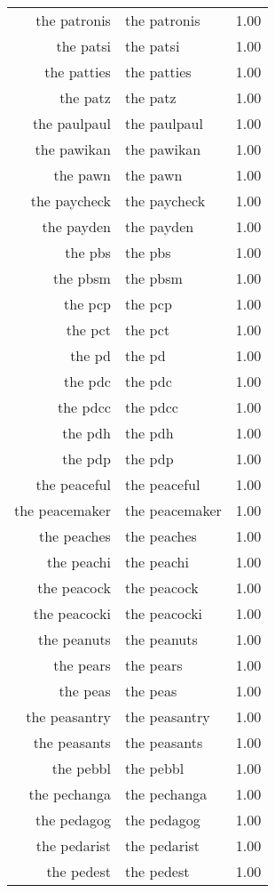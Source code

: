 \begin{table}[ht]
\begin{tabular}{rlr}
  the patronis & the patronis & 1.00 \\ 
  the patsi & the patsi & 1.00 \\ 
  the patties & the patties & 1.00 \\ 
  the patz & the patz & 1.00 \\ 
  the paulpaul & the paulpaul & 1.00 \\ 
  the pawikan & the pawikan & 1.00 \\ 
  the pawn & the pawn & 1.00 \\ 
  the paycheck & the paycheck & 1.00 \\ 
  the payden & the payden & 1.00 \\ 
  the pbs & the pbs & 1.00 \\ 
  the pbsm & the pbsm & 1.00 \\ 
  the pcp & the pcp & 1.00 \\ 
  the pct & the pct & 1.00 \\ 
  the pd & the pd & 1.00 \\ 
  the pdc & the pdc & 1.00 \\ 
  the pdcc & the pdcc & 1.00 \\ 
  the pdh & the pdh & 1.00 \\ 
  the pdp & the pdp & 1.00 \\ 
  the peaceful & the peaceful & 1.00 \\ 
  the peacemaker & the peacemaker & 1.00 \\ 
  the peaches & the peaches & 1.00 \\ 
  the peachi & the peachi & 1.00 \\ 
  the peacock & the peacock & 1.00 \\ 
  the peacocki & the peacocki & 1.00 \\ 
  the peanuts & the peanuts & 1.00 \\ 
  the pears & the pears & 1.00 \\ 
  the peas & the peas & 1.00 \\ 
  the peasantry & the peasantry & 1.00 \\ 
  the peasants & the peasants & 1.00 \\ 
  the pebbl & the pebbl & 1.00 \\ 
  the pechanga & the pechanga & 1.00 \\ 
  the pedagog & the pedagog & 1.00 \\ 
  the pedarist & the pedarist & 1.00 \\ 
  the pedest & the pedest & 1.00 \\ 

\end{tabular}
\end{table}

